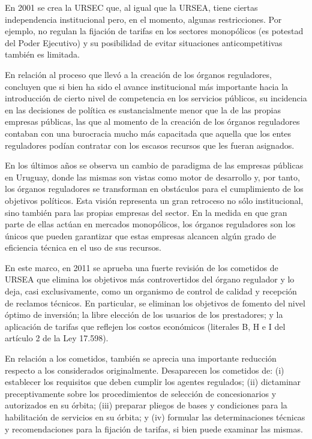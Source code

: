 \documentclass[
  12pt,
  spanish,
]{book}
\begin{document}
En 2001 se crea la URSEC que, al igual que la URSEA, tiene ciertas
independencia institucional pero, en el momento, algunas restricciones.
Por ejemplo, no regulan la fijación de tarifas en los sectores
monopólicos (es potestad del Poder Ejecutivo) y su posibilidad de evitar
situaciones anticompetitivas también es limitada.

En relación al proceso que llevó a la creación de los órganos
reguladores, \citet{Bergara2005} concluyen que si bien ha sido el avance
institucional más importante hacia la introducción de cierto nivel de
competencia en los servicios públicos, su incidencia en las decisiones
de política es sustancialmente menor que la de las propias empresas
públicas, las que al momento de la creación de los órganos reguladores
contaban con una burocracia mucho más capacitada que aquella que los
entes reguladores podían contratar con los escasos recursos que les
fueran asignados.

En los últimos años se observa un cambio de paradigma de las empresas
públicas en Uruguay, donde las mismas son vistas como motor de
desarrollo y, por tanto, los órganos reguladores se transforman en
obstáculos para el cumplimiento de los objetivos políticos. Esta visión
representa un gran retroceso no sólo institucional, sino también para
las propias empresas del sector. En la medida en que gran parte de ellas
actúan en mercados monopólicos, los órganos reguladores son los únicos
que pueden garantizar que estas empresas alcancen algún grado de
eficiencia técnica en el uso de sus recursos.

En este marco, en 2011 se aprueba una fuerte revisión de los cometidos
de URSEA que elimina los objetivos más controvertidos del órgano
regulador y lo deja, casi exclusivamente, como un organismo de control
de calidad y recepción de reclamos técnicos. En particular, se eliminan
los objetivos de fomento del nivel óptimo de inversión; la libre
elección de los usuarios de los prestadores; y la aplicación de tarifas
que reflejen los costos económicos (literales B, H e I del artículo 2 de
la Ley 17.598).

En relación a los cometidos, también se aprecia una importante reducción
respecto a los considerados originalmente. Desaparecen los cometidos de:
(i) establecer los requisitos que deben cumplir los agentes regulados;
(ii) dictaminar preceptivamente sobre los procedimientos de selección de
concesionarios y autorizados en su órbita; (iii) preparar pliegos de
bases y condiciones para la habilitación de servicios en su órbita; y
(iv) formular las determinaciones técnicas y recomendaciones para la
fijación de tarifas, si bien puede examinar las mismas.
\end{document}
